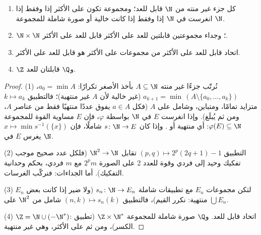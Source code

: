 \begin{proposition}\label{prop:b2:structures:countablestable}
\begin{enumerate}
  \item كل جزء غير منته من $\N$ قابل للعد؛ ومجموعة تكون 
        على الأكثر إذا وفقط إذا انغرست في $\N$ إذا وفقط إذا كانت
        خالية أو صورة شاملة للمجموعة $\N$.
  \item $\N \times \N$ ؛ وجداء مجموعتين قابلتين للعد على
        الأكثر قابل للعد على الأكثر.
  \item اتحاد قابل للعد على الأكثر من مجموعات  على الأكثر
        هو قابل للعد على الأكثر.
  \item $\Z$ و$\Q$ قابلتان للعد.
\end{enumerate}
\end{proposition}

\begin{proof}
(1) نُرتّب جزءًا غير منته $A \subseteq \N$ بأخذ الأصغر تكرارًا: $a_0 =
\min A$، $a_{k+1} = \min\,(A \setminus \{a_0, \dots, a_k\})$
(غير خالية لأن $A$ غير منتهية)؛ فالتطبيق $k \mapsto a_k$ متزايد تمامًا،
ومتباين، وشامل على $A$ (فكل $a \in A$
يفوق عددًا منتهيًا فقط من عناصر $A$، ومن ثم يُبلَغ). وإذا انغرست $E$
في $\N$ بواسطة $\varphi$، فإن $E$ مساوية القوة للمجموعة $\varphi(E) \subseteq \N$: أي
منتهية أو . وإذا كان $s \colon \N \to
E$ شاملًا، فإن $x \mapsto \min s^{-1}(\{x\})$ يغرس $E$
في $\N$.

(2) التطبيق $(p, q) \mapsto 2^p(2q + 1) - 1$ تقابل $\N^2
\to \N$ (فلكل عدد صحيح موجب تفكيك وحيد إلى
فردي وقوة للعدد 2 على الصورة $2^p m$ مع $m$ فردي، بحكم وحدانية
التفكيك). أما الجداءات: فنركّب الغرسات.

(3) لتكن مجموعات $E_n$ مع تطبيقات شاملة $s_n \colon \N \to E_n$
(ولا ضير إذا كانت بعض $E_n$ منتهية: نكرر القيم)، فالتطبيق $(n, k)
\mapsto s_n(k)$ شامل من  $\N^2$ على
$\bigcup E_n$.

(4) $\Z = \N \cup (-\N^*)$: اتحاد قابل للعد. و$\Q$ صورة شاملة
للمجموعة $\Z \times \N^*$ (تطبيق الكسر)، ومن ثم  على
الأكثر، وهي غير منتهية.
\end{proof}

